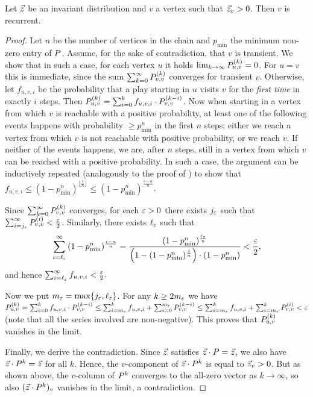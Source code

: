 \begin{lemma}
	\label{5-lem:MC-inv-rec}
Let $\vec{z}$ be an invariant distribution and $v$ a vertex such that $\vec{z}_v > 0$. Then $v$ is recurrent.	
\end{lemma}
\begin{proof}
Let $n$ be the number of vertices in the chain and $p_{\min}$ the minimum non-zero entry of $P$.
Assume, for the sake of contradiction, that $v$ is transient. We show that in such a case, for each vertex $u$ it holds $\lim_{k\rightarrow\infty} P^{(k)}_{u,v} = 0$. For $u=v$ this is immediate, since the sum $\sum_{k=0}^{\infty}P^{(k)}_{v,v}$ converges for  transient $v$. Otherwise, let $f_{u,v,i}$ be the probability that a play starting in $u$ visits $v$ for the \emph{first time} in exactly $i$ steps. Then $P^{(k)}_{u,v}=\sum_{i=0}^k f_{u,v,i}\cdot P^{(k-i)}_{v,v}$. Now when starting in a vertex from which $v$ is reachable with a positive probability, at least one of the following events happens with probability $\geq p_{\min}^n$ in the first $n$ steps: either we reach a vertex from which $v$ is not reachable with positive probability, or we reach $v$. If neither of the events happens, we are, after $n$ steps, still in a vertex from which $v$ can be reached with a positive probability. In such a case, the argument can be inductively repeated (analogously to the proof of ) to show that $f_{u,v,i}\leq (1-p_{\min}^n)^{\lfloor\frac{i}{n}\rfloor}\leq (1-p_{\min}^n)^{\frac{i-n}{n}}$.

Since $\sum_{k=0}^{\infty}P^{(k)}_{v,v}$ converges, for each $\varepsilon>0$ there exists $j_\varepsilon$ such that $\sum_{i=j_{\varepsilon}}^{\infty}P^{(i)}_{v,v} < \frac{\varepsilon}{2}$. Similarly, there exists $\ell_\varepsilon$ such that $$\sum_{i=\ell_{\varepsilon}}^{\infty}{(1-p_{\min}^n)^{\frac{i-n}{n}}} = \frac{(1-p_{\min}^n)^{\frac{\ell_\varepsilon}{n}}}{\left(1-(1-p_{\min}^n)^{\frac{1}{n}}\right)\cdot(1-p_{\min}^n)}< \frac{\varepsilon}{2},$$ and hence $\sum_{i=\ell_{\varepsilon}}^{\infty} f_{u,v,i}< \frac{\varepsilon}{2}.$

Now we put $m_{\varepsilon}=\max\{j_\varepsilon,\ell_\varepsilon\}$. For any $k\geq 2m_{\varepsilon}$ we have $P^{(k)}_{u,v}=\sum_{i=0}^k f_{u,v,i}\cdot P^{(k-i)}_{v,v} \leq \sum_{i=m_{\varepsilon}}^{k}f_{u,v,i} + \sum_{i=0}^{m_{\varepsilon}}P^{(k-i)}_{v,v}\leq\sum_{i=m_{\varepsilon}}^{k}f_{u,v,i} + \sum_{i=m_{\varepsilon}}^{k}P^{(i)}_{v,v}<\varepsilon$ (note that all the series involved are non-negative). This proves that $P^{(k)}_{u,v}$ vanishes in the limit.

Finally, we derive the contradiction. Since $\vec{z}$ satisfies $\vec{z}\cdot P = \vec{z}$, we also have $\vec{z}\cdot P^k = \vec{z}$ for all $k$. Hence, the $v$-component of $\vec{z}\cdot P^k$ is equal to $\vec{z}_v>0$. But as shown above, the $v$-column of $P^k$ converges to the all-zero vector as $k\rightarrow \infty$, so also $(\vec{z}\cdot P^k)_v$ vanishes in the limit, a contradiction.
\end{proof}

